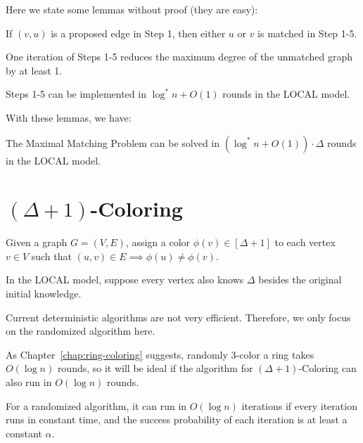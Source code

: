 Here we state some lemmas without proof (they are easy):

\begin{lemma}
  If $(v,u)$ is a proposed edge in Step 1, then either $u$ or $v$ is matched in Step 1-5.
\end{lemma}

\begin{lemma}
  One iteration of Steps 1-5 reduces the maximum degree of the unmatched graph by at least 1.
\end{lemma}

\begin{lemma}
  Steps 1-5 can be implemented in $\log^*n + O(1)$ rounds in the LOCAL model.
\end{lemma}

With these lemmas, we have:

\begin{theorem}
  The Maximal Matching Problem can be solved in $(\log^*n+O(1))\cdot \Delta$ rounds in the LOCAL model.
\end{theorem}

\chapter{$(\Delta + 1)$-Coloring}

\begin{question}
  Given a graph \( G = (V, E) \), assign a color \( \phi(v) \in [\Delta + 1] \) to each vertex \( v \in V \) such that $(u,v) \in E\implies\phi(u) \neq \phi(v)$.

  In the LOCAL model, suppose every vertex also knows $\Delta$ besides the original initial knowledge.
\end{question}

Current deterministic algorithms are not very efficient. Therefore, we only focus on the randomized algorithm here.

As Chapter~\ref{chap:ring-coloring} suggests, randomly 3-color a ring takes $O(\log n)$ rounds, so it will be ideal if the algorithm for $(\Delta + 1)$-Coloring can also run in $O(\log n)$ rounds.

\begin{remark} \label{rem:rand-algo-logn-iterations}
  For a randomized algorithm, it can run in $O(\log n)$ iterations if every iteration runs in constant time, and the success probability of each iteration is at least a constant $\alpha$.
\end{remark}

